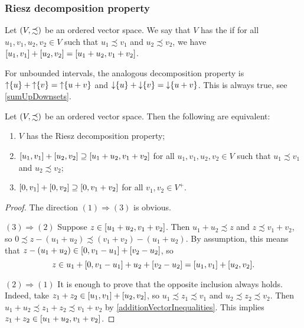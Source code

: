 \subsubsection{Riesz decomposition property}
\begin{definition}
Let $\sSet{V, \precsim}$ be an ordered vector space. We say that $V$ has the  if for all $u_1,v_1,u_2,v_2\in V$ such that $u_1\precsim v_1$ and $u_2\precsim v_2$, we have $\interval{u_1,v_1} + \interval{u_2,v_2} = \interval{u_1+u_2,v_1+v_2}$.
\end{definition}

For unbounded intervals, the analogous decomposition property is $\operatorname{\uparrow}\{u\} + \operatorname{\uparrow}\{v\} = \operatorname{\uparrow}\{u+v\}$ and $\operatorname{\downarrow}\{u\} + \operatorname{\downarrow}\{v\} = \operatorname{\downarrow}\{u+v\}$. This is always true, see \ref{sumUpDownsets}.

\begin{lemma} \label{RieszDecompositionLemma}
Let $\sSet{V, \precsim}$ be an ordered vector space. Then the following are equivalent:
\begin{enumerate}
\item $V$ has the Riesz decomposition property;
\item $\interval{u_1,v_1} + \interval{u_2,v_2} \supseteq \interval{u_1+u_2,v_1+v_2}$ for all $u_1,v_1,u_2,v_2\in V$ such that $u_1\precsim v_1$ and $u_2\precsim v_2$;
\item $\interval{0,v_1} + \interval{0,v_2} \supseteq \interval{0,v_1+v_2}$ for all $v_1,v_2\in V^+$.
\end{enumerate}
\end{lemma}
\begin{proof}
The direction $(1) \Rightarrow (3)$ is obvious.

$(3) \Rightarrow (2)$ Suppose $z\in \interval{u_1+u_2,v_1+v_2}$. Then $u_1+u_2 \precsim z$ and $z\precsim v_1+v_2$, so $0\precsim z - (u_1+u_2) \precsim (v_1+v_2) - (u_1+u_2)$. By assumption, this means that $z - (u_1+u_2)\in \interval{0, v_1 - u_1} + \interval{v_2 - u_2}$, so
\[ z \in u_1 + \interval{0, v_1 - u_1} + u_2 + \interval{v_2 - u_2} = \interval{u_1,v_1} + \interval{u_2,v_2}. \]

$(2) \Rightarrow (1)$ It is enough to prove that the opposite inclusion always holds. Indeed, take $z_1 + z_2 \in \interval{u_1,v_1} + \interval{u_2,v_2}$, so $u_1 \precsim z_1 \precsim v_1$ and $u_2 \precsim z_2 \precsim v_2$. Then $u_1 + u_2 \precsim z_1 + z_2 \precsim v_1 + v_2$ by \ref{additionVectorInequalities}. This implies $z_1+z_2 \in \interval{u_1+u_2,v_1+v_2}$.
\end{proof}

